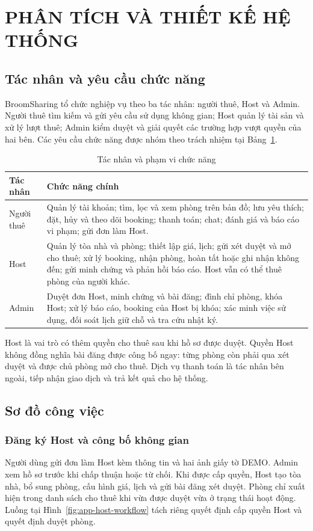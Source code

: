 \chapstart
\section{PHÂN TÍCH VÀ THIẾT KẾ HỆ THỐNG}
\subsection{Tác nhân và yêu cầu chức năng}
BroomSharing tổ chức nghiệp vụ theo ba tác nhân: người thuê, Host và Admin. Người thuê tìm kiếm và gửi yêu cầu sử dụng không gian; Host quản lý tài sản và xử lý lượt thuê; Admin kiểm duyệt và giải quyết các trường hợp vượt quyền của hai bên. Các yêu cầu chức năng được nhóm theo trách nhiệm tại Bảng~\ref{tab:ch2-actors}.

\begin{table}[!htbp]\centering\small
\caption{Tác nhân và phạm vi chức năng}\label{tab:ch2-actors}
\begin{tabularx}{\textwidth}{@{}p{2cm}X@{}}\toprule
Tác nhân & Chức năng chính\\\midrule
Người thuê & Quản lý tài khoản; tìm, lọc và xem phòng trên bản đồ; lưu yêu thích; đặt, hủy và theo dõi booking; thanh toán; chat; đánh giá và báo cáo vi phạm; gửi đơn làm Host.\\
Host & Quản lý tòa nhà và phòng; thiết lập giá, lịch; gửi xét duyệt và mở cho thuê; xử lý booking, nhận phòng, hoàn tất hoặc ghi nhận không đến; gửi minh chứng và phản hồi báo cáo. Host vẫn có thể thuê phòng của người khác.\\
Admin & Duyệt đơn Host, minh chứng và bài đăng; đình chỉ phòng, khóa Host; xử lý báo cáo, booking của Host bị khóa; xác minh việc sử dụng, đối soát lịch giữ chỗ và tra cứu nhật ký.\\\bottomrule
\end{tabularx}
\end{table}

Host là vai trò có thêm quyền cho thuê sau khi hồ sơ được duyệt. Quyền Host không đồng nghĩa bài đăng được công bố ngay: từng phòng còn phải qua xét duyệt và được chủ phòng mở cho thuê. Dịch vụ thanh toán là tác nhân bên ngoài, tiếp nhận giao dịch và trả kết quả cho hệ thống.

\subsection{Sơ đồ công việc}
\subsubsection{Đăng ký Host và công bố không gian}
Người dùng gửi đơn làm Host kèm thông tin và hai ảnh giấy tờ DEMO. Admin xem hồ sơ trước khi chấp thuận hoặc từ chối. Khi được cấp quyền, Host tạo tòa nhà, bổ sung phòng, cấu hình giá, lịch và gửi bài đăng xét duyệt. Phòng chỉ xuất hiện trong danh sách cho thuê khi vừa được duyệt vừa ở trạng thái hoạt động. Luồng tại Hình~\ref{fig:app-host-workflow} tách riêng quyết định cấp quyền Host và quyết định duyệt phòng.

